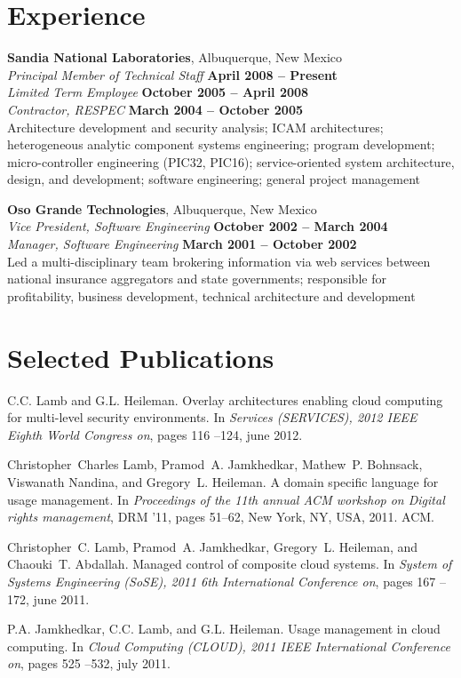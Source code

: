 \documentclass[margin,line]{resume}
\begin{document}
\begin{resume}
\section{\mysidestyle Experience}
{\bf Sandia National Laboratories}, Albuquerque, New Mexico \vspace{2mm} \\
{\sl Principal Member of Technical Staff} \hfill \textbf{April 2008 -- Present} \\
{\sl Limited Term Employee} \hfill \textbf{October 2005 -- April 2008} \\\vspace{1mm}%
{\sl Contractor, RESPEC} \hfill \textbf{March 2004 -- October 2005} \\
Architecture development and security analysis; ICAM architectures; heterogeneous analytic component systems engineering; program development; micro-controller engineering (PIC32, PIC16); service-oriented system architecture, design, and development; software engineering; general project management 

{\bf Oso Grande Technologies}, Albuquerque, New Mexico \vspace{2mm} \\
{\sl Vice President, Software Engineering} \hfill \textbf{October 2002 -- March 2004} \\\vspace{1mm}%
{\sl Manager, Software Engineering} \hfill \textbf{March 2001 -- October 2002} \\
Led a multi-disciplinary team brokering information via web services between national insurance aggregators and state governments; responsible for profitability, business development, technical architecture and development

\section{\mysidestyle Selected Publications}
C.C. Lamb and G.L. Heileman.
\newblock Overlay architectures enabling cloud computing for multi-level
  security environments.
\newblock In {\em Services (SERVICES), 2012 IEEE Eighth World Congress on},
  pages 116 --124, june 2012.

Christopher~Charles Lamb, Pramod~A. Jamkhedkar, Mathew~P. Bohnsack, Viswanath
  Nandina, and Gregory~L. Heileman.
\newblock A domain specific language for usage management.
\newblock In {\em Proceedings of the 11th annual ACM workshop on Digital rights
  management}, DRM '11, pages 51--62, New York, NY, USA, 2011. ACM.

Christopher~C. Lamb, Pramod~A. Jamkhedkar, Gregory~L. Heileman, and Chaouki~T.
  Abdallah.
\newblock Managed control of composite cloud systems.
\newblock In {\em System of Systems Engineering (SoSE), 2011 6th International
  Conference on}, pages 167 --172, june 2011.

P.A. Jamkhedkar, C.C. Lamb, and G.L. Heileman.
\newblock Usage management in cloud computing.
\newblock In {\em Cloud Computing (CLOUD), 2011 IEEE International Conference
  on}, pages 525 --532, july 2011.

\end{resume}
\end{document}
